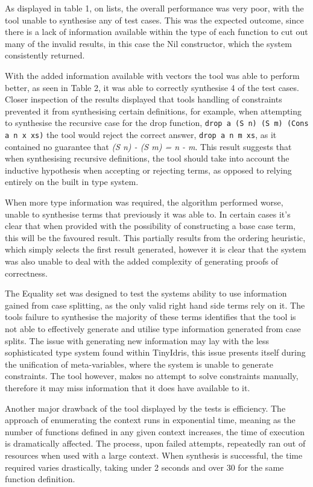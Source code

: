 \documentclass[a4paper]{article}
\begin{document}
As displayed in table 1, on lists, the overall performance
was very poor, with the tool unable to synthesise
any of test cases. This was the expected outcome, since there
is a lack of information available within the type of
each function to cut out many of the invalid results, in this case the Nil constructor,
which the system consistently returned. 

With the added information available with vectors the tool was 
able to perform better, as seen in Table 2, it was able to correctly
synthesise 4 of the test cases. Closer inspection of the results displayed that tools
handling of constraints prevented it from synthesising certain definitions,
for example, when attempting to synthesise the recursive case for the
drop function, \texttt{drop a (S n) (S m) (Cons a n x xs)} the tool
would reject the correct answer, \texttt{drop a n m xs}, as it
contained no guarantee that \textit{(S n) - (S m) = n - m}. This
result suggests that when synthesising recursive definitions, the
tool should take into account the inductive hypothesis when
accepting or rejecting terms, as opposed to relying entirely on the
built in type system.

When more type information was required, the algorithm performed
worse, unable to synthesise terms that previously it was able to.
In certain cases it's clear that when provided with the possibility
of constructing a base case term, this will be the favoured
result. This partially results from the ordering heuristic, which simply
selects the first result generated, however it is clear that the system
was also unable to deal with the added complexity of generating proofs of
correctness. 

The Equality set was designed to test the systems ability to use
information gained from case splitting, as the only valid right hand side
terms rely on it. The tools failure to synthesise the majority of these terms
identifies that the tool is not able to effectively generate and utilise
type information generated from case splits. The issue with generating new information
may lay with the less sophisticated type system found within TinyIdris, this issue
presents itself during the unification of meta-variables, where the system is unable to generate
constraints. The tool however, makes no attempt to solve constraints manually,
therefore it may miss information that it does have available to it.

Another major drawback of the tool displayed by the tests is efficiency.
The approach of enumerating the context runs in exponential time, meaning as
the number of functions defined in any given context increases, the time of execution
is dramatically affected. The process, upon failed attempts, repeatedly
ran out of resources when used with a large context. When synthesis is successful,
the time required varies drastically, taking under 2 seconds and over 30 for the same function
definition. 
\end{document}

